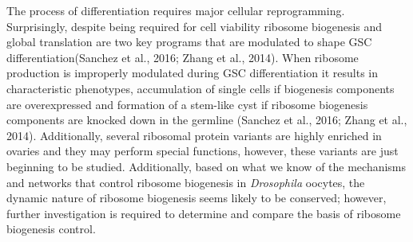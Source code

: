 \documentclass[12pt,twoside]{reedthesis}
\begin{document}
The process of differentiation requires major cellular reprogramming.
Surprisingly, despite being required for cell viability ribosome
biogenesis and global translation are two key programs that are
modulated to shape GSC differentiation(Sanchez et al., 2016; Zhang et al., 2014).
When ribosome production is improperly modulated during GSC
differentiation it results in characteristic phenotypes, accumulation of
single cells if biogenesis components are overexpressed and formation of
a stem-like cyst if ribosome biogenesis components are knocked down in
the germline (Sanchez et al., 2016; Zhang et al., 2014). Additionally, several
ribosomal protein variants are highly enriched in ovaries and they may
perform special functions, however, these variants are just beginning to
be studied. Additionally, based on what we know of the mechanisms and
networks that control ribosome biogenesis in \emph{Drosophila} oocytes, the
dynamic nature of ribosome biogenesis seems likely to be conserved;
however, further investigation is required to determine and compare the
basis of ribosome biogenesis control.
\end{document}
